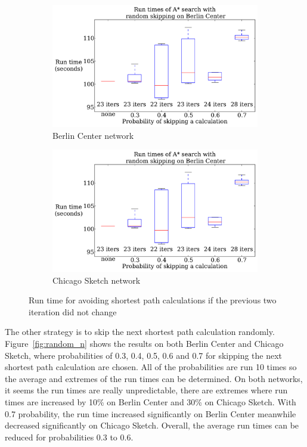 \begin{figure}[!ht]
    \centering
    \begin{subfigure}{.5\textwidth}
        \centering
        \includegraphics[page=3,width=\textwidth]{img/random_time}
        \caption{Berlin Center network}
        \label{fig:berlin_skip_n}
    \end{subfigure}%
    \begin{subfigure}{.5\textwidth}
        \centering
        \includegraphics[page=4,width=\textwidth]{img/random_time}
        \caption{Chicago Sketch network}
        \label{fig:chicago_skip_n}
    \end{subfigure}
    \caption{Run time for avoiding shortest path calculations if the previous two iteration did not change}
    \label{fig:skip_n}
\end{figure}

The other strategy is to skip the next shortest path calculation randomly.
Figure~\ref{fig:random_n} shows the results on both Berlin Center and Chicago Sketch, where probabilities of 0.3, 0.4, 0.5, 0.6 and 0.7 for skipping the next shortest path calculation are chosen.
All of the probabilities are run 10 times so the average and extremes of the run times can be determined.
On both networks, it seems the run times are really unpredictable,
there are extremes where run times are increased by 10\% on Berlin Center and 30\% on Chicago Sketch. With 0.7 probability, the run time increased significantly on Berlin Center meanwhile decreased significantly on Chicago Sketch.
Overall, the average run times can be reduced for probabilities 0.3 to 0.6.

